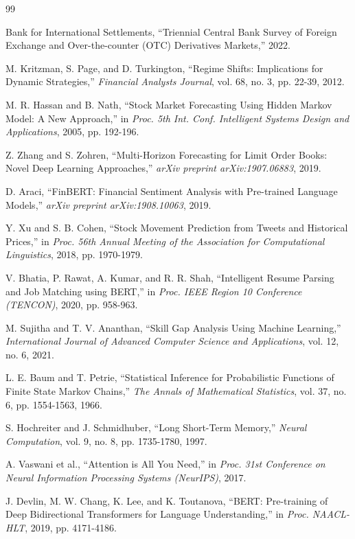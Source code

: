 \documentclass[conference]{IEEEtran}
\begin{document}
\begin{thebibliography}{99}

Bank for International Settlements, ``Triennial Central Bank Survey of Foreign Exchange and Over-the-counter (OTC) Derivatives Markets,'' 2022.

M. Kritzman, S. Page, and D. Turkington, ``Regime Shifts: Implications for Dynamic Strategies,'' \textit{Financial Analysts Journal}, vol. 68, no. 3, pp. 22-39, 2012.

M. R. Hassan and B. Nath, ``Stock Market Forecasting Using Hidden Markov Model: A New Approach,'' in \textit{Proc. 5th Int. Conf. Intelligent Systems Design and Applications}, 2005, pp. 192-196.

Z. Zhang and S. Zohren, ``Multi-Horizon Forecasting for Limit Order Books: Novel Deep Learning Approaches,'' \textit{arXiv preprint arXiv:1907.06883}, 2019.

D. Araci, ``FinBERT: Financial Sentiment Analysis with Pre-trained Language Models,'' \textit{arXiv preprint arXiv:1908.10063}, 2019.

Y. Xu and S. B. Cohen, ``Stock Movement Prediction from Tweets and Historical Prices,'' in \textit{Proc. 56th Annual Meeting of the Association for Computational Linguistics}, 2018, pp. 1970-1979.

V. Bhatia, P. Rawat, A. Kumar, and R. R. Shah, ``Intelligent Resume Parsing and Job Matching using BERT,'' in \textit{Proc. IEEE Region 10 Conference (TENCON)}, 2020, pp. 958-963.

M. Sujitha and T. V. Ananthan, ``Skill Gap Analysis Using Machine Learning,'' \textit{International Journal of Advanced Computer Science and Applications}, vol. 12, no. 6, 2021.

L. E. Baum and T. Petrie, ``Statistical Inference for Probabilistic Functions of Finite State Markov Chains,'' \textit{The Annals of Mathematical Statistics}, vol. 37, no. 6, pp. 1554-1563, 1966.

S. Hochreiter and J. Schmidhuber, ``Long Short-Term Memory,'' \textit{Neural Computation}, vol. 9, no. 8, pp. 1735-1780, 1997.

A. Vaswani et al., ``Attention is All You Need,'' in \textit{Proc. 31st Conference on Neural Information Processing Systems (NeurIPS)}, 2017.

J. Devlin, M. W. Chang, K. Lee, and K. Toutanova, ``BERT: Pre-training of Deep Bidirectional Transformers for Language Understanding,'' in \textit{Proc. NAACL-HLT}, 2019, pp. 4171-4186.

\end{thebibliography}
\end{document}
